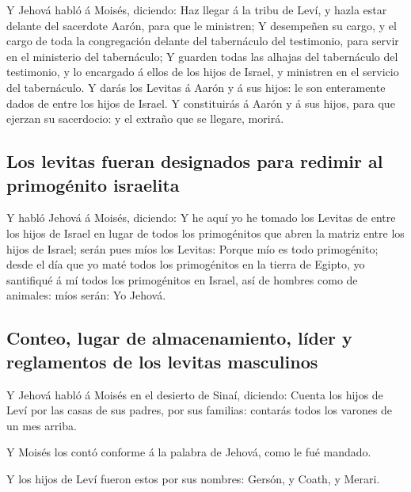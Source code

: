  Y Jehová habló á Moisés, diciendo:  Haz llegar
á la tribu de Leví, y hazla estar delante del sacerdote Aarón, para que
le ministren;  Y desempeñen su cargo, y el cargo de toda la
congregación delante del tabernáculo del testimonio, para servir en el
ministerio del tabernáculo;  Y guarden todas las alhajas del
tabernáculo del testimonio, y lo encargado á ellos de los hijos de
Israel, y ministren en el servicio del tabernáculo.  Y darás
los Levitas á Aarón y á sus hijos: le son enteramente dados de entre los
hijos de Israel.  Y constituirás á Aarón y á sus hijos,
para que ejerzan su sacerdocio: y el extraño que se llegare, morirá.

\hypertarget{los-levitas-fueran-designados-para-redimir-al-primoguxe9nito-israelita}{%
\subsection{Los levitas fueran designados para redimir al primogénito
israelita}\label{los-levitas-fueran-designados-para-redimir-al-primoguxe9nito-israelita}}

 Y habló Jehová á Moisés, diciendo:  Y he aquí
yo he tomado los Levitas de entre los hijos de Israel en lugar de todos
los primogénitos que abren la matriz entre los hijos de Israel; serán
pues míos los Levitas:  Porque mío es todo primogénito;
desde el día que yo maté todos los primogénitos en la tierra de Egipto,
yo santifiqué á mí todos los primogénitos en Israel, así de hombres como
de animales: míos serán: Yo Jehová.

\hypertarget{conteo-lugar-de-almacenamiento-luxedder-y-reglamentos-de-los-levitas-masculinos}{%
\subsection{Conteo, lugar de almacenamiento, líder y reglamentos de los
levitas
masculinos}\label{conteo-lugar-de-almacenamiento-luxedder-y-reglamentos-de-los-levitas-masculinos}}

 Y Jehová habló á Moisés en el desierto de Sinaí, diciendo:
 Cuenta los hijos de Leví por las casas de sus padres, por
sus familias: contarás todos los varones de un mes arriba.

 Y Moisés los contó conforme á la palabra de Jehová, como
le fué mandado.

 Y los hijos de Leví fueron estos por sus nombres: Gersón,
y Coath, y Merari.

